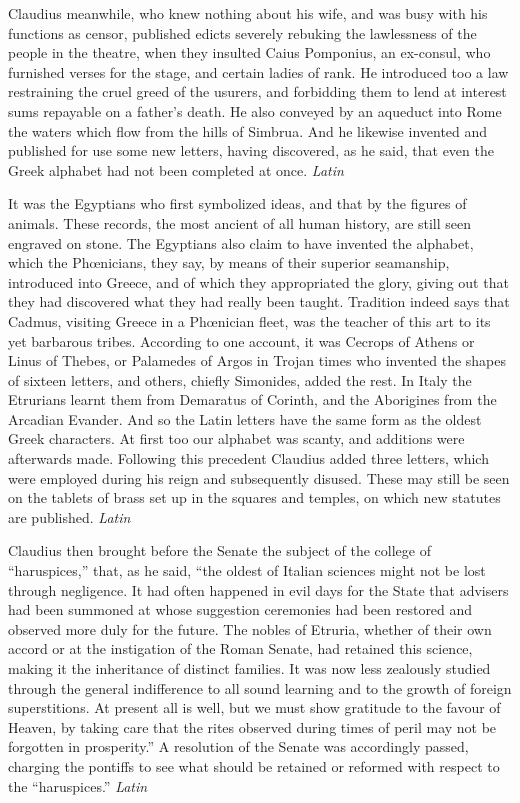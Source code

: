 
Claudius meanwhile, who knew nothing about his wife, and was busy with his functions as censor, published edicts severely rebuking the lawlessness of the people in the theatre, when they insulted Caius Pomponius, an ex-consul, who furnished verses for the stage, and certain ladies of rank. He introduced too a law restraining the cruel greed of the usurers, and forbidding them to lend at interest sums repayable on a father's death. He also conveyed by an aqueduct into Rome the waters which flow from the hills of Simbrua. And he likewise invented and published for use some new letters, having discovered, as he said, that even the Greek alphabet had not been completed at once. \emph{Latin}


It was the Egyptians who first symbolized ideas, and that by the figures of animals. These records, the most ancient of all human history, are still seen engraved on stone. The Egyptians also claim to have invented the alphabet, which the Phœnicians, they say, by means of their superior seamanship, introduced into Greece, and of which they appropriated the glory, giving out that they had discovered what they had really been taught. Tradition indeed says that Cadmus, visiting Greece in a Phœnician fleet, was the teacher of this art to its yet barbarous tribes. According to one account, it was Cecrops of Athens or Linus of Thebes, or Palamedes of Argos in Trojan times who invented the shapes of sixteen letters, and others, chiefly Simonides, added the rest. In Italy the Etrurians learnt them from Demaratus of Corinth, and the Aborigines from the Arcadian Evander. And so the Latin letters have the same form as the oldest Greek characters. At first too our alphabet was scanty, and additions were afterwards made. Following this precedent Claudius added three letters, which were employed during his reign and subsequently disused. These may still be seen on the tablets of brass set up in the squares and temples, on which new statutes are published. \emph{Latin}


Claudius then brought before the Senate the subject of the college of ``haruspices,'' that, as he said, ``the oldest of Italian sciences might not be lost through negligence. It had often happened in evil days for the State that advisers had been summoned at whose suggestion ceremonies had been restored and observed more duly for the future. The nobles of Etruria, whether of their own accord or at the instigation of the Roman Senate, had retained this science, making it the inheritance of distinct families. It was now less zealously studied through the general indifference to all sound learning and to the growth of foreign superstitions. At present all is well, but we must show gratitude to the favour of Heaven, by taking care that the rites observed during times of peril may not be forgotten in prosperity.'' A resolution of the Senate was accordingly passed, charging the pontiffs to see what should be retained or reformed with respect to the ``haruspices.'' \emph{Latin}

